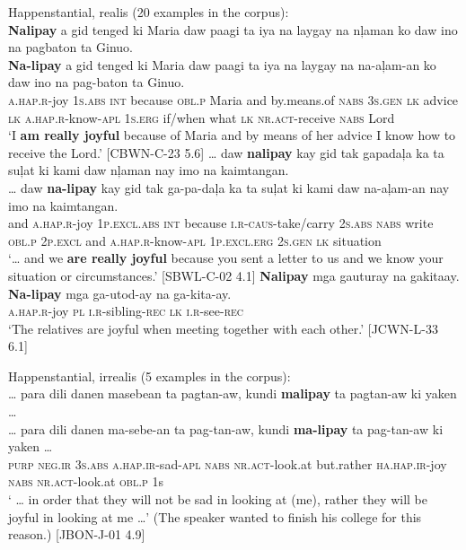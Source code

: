 \ea
\label{ex:receivethelord}
Happenstantial, realis (20 examples in the corpus): \\
\textbf{Nalipay}  a  gid  tenged  ki  Maria  daw  paagi  ta  iya na  laygay  na  nļaman  ko  daw  ino  na pagbaton  ta  Ginuo. \\\smallskip
\gll \textbf{Na-lipay}  a  gid  tenged  ki  Maria  daw  paagi  ta  iya na  laygay  na  na-aļam-an  ko  daw  ino  na pag-baton  ta  Ginuo. \\
\textsc{a.hap.r}-joy  1\textsc{s.abs}  \textsc{int}  because  \textsc{obl.p}  Maria  and  by.means.of   \textsc{nabs}  3\textsc{s.gen}
\textsc{lk}   advice  \textsc{lk}  \textsc{a.hap.r}-know-\textsc{apl}  1\textsc{s.erg}  if/when  what  \textsc{lk}
\textsc{nr.act}-receive  \textsc{nabs}  Lord \\
\glt `I \textbf{am really joyful} because of Maria and by means of her advice I know how to receive the Lord.’ [CBWN-C-23 5.6]
\z
\ea
 … daw  \textbf{nalipay}  kay  gid  tak gapadaļa ka  ta suļat  ki  kami  daw  nļaman  nay imo  na  kaimtangan. \\\smallskip
\gll  … daw  \textbf{na-lipay}  kay  gid  tak ga-pa-daļa ka  ta suļat  ki  kami  daw  na-aļam-an  nay imo  na  kaimtangan. \\
{} and  \textsc{a.hap.r}-joy  1\textsc{p.excl.abs}  \textsc{int}  because  \textsc{i.r}-\textsc{caus}-take/carry
2\textsc{s.abs}  \textsc{nabs} write  \textsc{obl.p}  2\textsc{p.excl}  and  \textsc{a.hap.r}-know-\textsc{apl}  1\textsc{p.excl.erg} 2\textsc{s.gen}  \textsc{lk}  situation \\
\glt `… and we \textbf{are really joyful} because you sent a letter to us and we know your situation or circumstances.’ [SBWL-C-02  4.1]
\z
\ea
\label{ex:togetherwitheachother}
\textbf{Nalipay}  mga  gauturay  na  gakitaay. \\\smallskip
\gll \textbf{Na-lipay}  mga  ga-utod-ay  na  ga-kita-ay. \\
\textsc{a.hap.r}-joy  \textsc{pl}  \textsc{i.r}-sibling-\textsc{rec}  \textsc{lk}  \textsc{i.r}-see-\textsc{rec} \\
\glt ‘The relatives are joyful when meeting together with each other.’ [JCWN-L-33 6.1]
\z

\ea
\label{ex:lookingatme}
Happenstantial, irrealis (5 examples in the corpus): \\
 … para  dili  danen  masebean  ta  pagtan-aw,  kundi \textbf{malipay}  ta  pagtan-aw  ki  yaken … \\\smallskip
\gll  … para  dili  danen  ma-sebe-an  ta  pag-tan-aw,  kundi\footnotemark{} \textbf{ma-lipay}  ta  pag-tan-aw  ki  yaken … \\
 {} \textsc{purp}  \textsc{neg.ir}   3\textsc{s.abs} \textsc{a.hap.ir}-sad-\textsc{apl}  \textsc{nabs}  \textsc{nr.act}-look.at  but.rather
\textsc{ha.hap.ir}-joy  \textsc{nabs}  \textsc{nr.act}-look.at  \textsc{obl.p}  1s \\
\glt ` … in order that they will not be sad in looking at (me), rather they will be joyful in looking at me …’ (The speaker wanted to finish his college for this reason.) [JBON-J-01 4.9]
\z

